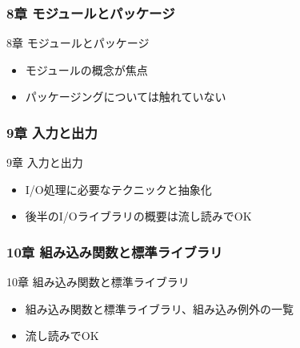 \documentclass[aspectratio=169,dvipdfmx,12pt,notheorems]{beamer}
\theoremstyle{definition}
\begin{document}
\begin{frame}\frametitle{8章 モジュールとパッケージ}

\begin{block}{8章 モジュールとパッケージ}
\begin{itemize}
\item モジュールの概念が焦点
\item パッケージングについては触れていない
\end{itemize}
\end{block}

\end{frame}

\begin{frame}\frametitle{9章 入力と出力}

\begin{block}{9章 入力と出力}
\begin{itemize}
\item I/O処理に必要なテクニックと抽象化
\item 後半のI/Oライブラリの概要は流し読みでOK
\end{itemize}
\end{block}

\end{frame}

\begin{frame}\frametitle{10章 組み込み関数と標準ライブラリ}

\begin{block}{10章 組み込み関数と標準ライブラリ}
\begin{itemize}
\item 組み込み関数と標準ライブラリ、組み込み例外の一覧
\item 流し読みでOK
\end{itemize}
\end{block}

\end{frame}
\end{document}
